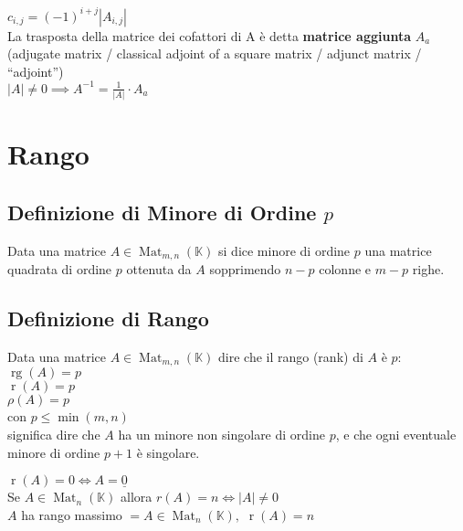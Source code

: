\documentclass[a4paper, twoside, italian, 11pt]{book}
\newcommand{\detm}[1] {\left | #1 \right |}
\DeclareMathOperator{\Mat}{Mat}
\DeclareMathOperator{\rg}{rg}
\DeclareMathOperator{\mr}{r}
\newcommand{\K}{\mathbb K}
\begin{document}
\noindent
$c_{i,j} = (-1)^{i+j} \detm{A_{i,j}}$ \\

\noindent
La trasposta della matrice dei cofattori di A è detta \textbf{matrice aggiunta} $A_a$ (adjugate matrix / classical adjoint of a square matrix / adjunct matrix / ``adjoint'') \\

\noindent
$\detm A \neq 0 \implies A^{-1} = \frac{1}{\detm A} \cdot A_a$



\section{Rango}



\subsection{Definizione di Minore di Ordine $p$}

Data una matrice $A \in \Mat_{m,n}(\K)$ si dice minore di ordine $p$ una matrice quadrata di ordine $p$ ottenuta da $A$ sopprimendo $n-p$ colonne e $m-p$ righe.


\subsection{Definizione di Rango}

Data una matrice $A \in \Mat_{m,n}(\K)$ dire che il rango (rank) di $A$ è $p$: \\

\noindent
$\rg(A) = p$ \\
$\mr(A) = p$ \\
$\rho(A) = p$ \\

\noindent
con $p \leq \min(m, n)$ \\

\noindent
significa dire che $A$ ha un minore non singolare di ordine $p$, e che ogni eventuale minore di ordine $p + 1$ è singolare.

\noindent
$\mr(A) = 0 \iff A = \underline{0}$ \\

\noindent
Se $A \in \Mat_n(\K)$ allora $r(A) = n \iff \detm A \neq 0$ \\

\noindent
$A$ ha rango massimo $= A \in \Mat_n(\K),$ $\mr(A) = n$ \\
\end{document}
